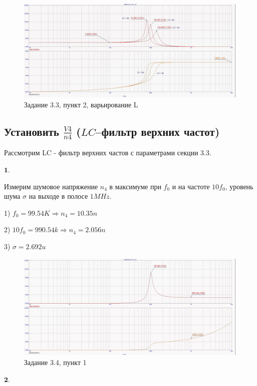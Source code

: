 \documentclass[a4paper, 14pt]{extarticle}%
\begin{document}
\begin{figure}[h!]
			\centering
			\includegraphics[width=1.1\linewidth]{3/3_3_4.jpg}
			\caption{Задание 3.3, пункт 2, варьирование L}
			\label{A}
\end{figure}

\subsection{Установить $\frac{V4}{n4}$ ($LC$--фильтр верхних частот)}

Рассмотрим LC - фильтр верхних частов с параметрами секции 3.3.


$ \textbf{1.} $


Измерим шумовое напряжение $n_4$ в максимуме при $f_0$ и на частоте $10f_0$, уровень шума $\sigma$ на выходе в полосе $1MHz$.

1) $f_0 = 99.54K \Rightarrow n_4 = 10.35n $

2) $10f_0 = 990.54k \Rightarrow n_4 = 2.056n$

3) $\sigma = 2.692u$


\begin{figure}[h!]
			\centering
			\includegraphics[width=1.1\linewidth]{3/3_3_6.jpg}
			\caption{Задание 3.4, пункт 1}
			\label{A}
\end{figure}

$ \textbf{2.} $
\end{document}
